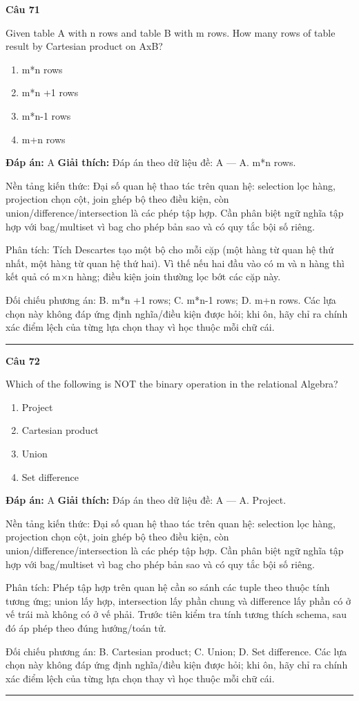 \documentclass[11pt,a4paper]{article}
\newenvironment{question}[1]{%
  \par\vspace{1em}\noindent\textbf{\large Câu #1}\par\vspace{0.4em}
}{%
  \par\vspace{1em}\hrule\vspace{0.6em}
}
\newenvironment{choices}{%
  \begin{enumerate}[label=\textbf{\Alph*.},leftmargin=2.2em,itemsep=2pt,topsep=3pt]
}{%
  \end{enumerate}
}
\newcommand{\choice}{\item}
\begin{document}
\begin{question}{71}
Given table A with n rows and table B with m rows. How many rows of table result by Cartesian product on AxB?
\begin{choices}
\choice m*n rows
\choice m*n +1 rows
\choice m*n-1 rows
\choice m+n rows
\end{choices}
\textbf{Đáp án:} A
\textbf{Giải thích:} Đáp án theo dữ liệu đề: A — A. m*n rows.

Nền tảng kiến thức: Đại số quan hệ thao tác trên quan hệ: selection lọc hàng, projection chọn cột, join ghép bộ theo điều kiện, còn union/difference/intersection là các phép tập hợp. Cần phân biệt ngữ nghĩa tập hợp với bag/multiset vì bag cho phép bản sao và có quy tắc bội số riêng.

Phân tích: Tích Descartes tạo một bộ cho mỗi cặp (một hàng từ quan hệ thứ nhất, một hàng từ quan hệ thứ hai). Vì thế nếu hai đầu vào có m và n hàng thì kết quả có m×n hàng; điều kiện join thường lọc bớt các cặp này.

Đối chiếu phương án: B. m*n +1 rows; C. m*n-1 rows; D. m+n rows. Các lựa chọn này không đáp ứng định nghĩa/điều kiện được hỏi; khi ôn, hãy chỉ ra chính xác điểm lệch của từng lựa chọn thay vì học thuộc mỗi chữ cái.
\end{question}

\begin{question}{72}
Which of the following is NOT the binary operation in the relational Algebra?
\begin{choices}
\choice Project
\choice Cartesian product
\choice Union
\choice Set difference
\end{choices}
\textbf{Đáp án:} A
\textbf{Giải thích:} Đáp án theo dữ liệu đề: A — A. Project.

Nền tảng kiến thức: Đại số quan hệ thao tác trên quan hệ: selection lọc hàng, projection chọn cột, join ghép bộ theo điều kiện, còn union/difference/intersection là các phép tập hợp. Cần phân biệt ngữ nghĩa tập hợp với bag/multiset vì bag cho phép bản sao và có quy tắc bội số riêng.

Phân tích: Phép tập hợp trên quan hệ cần so sánh các tuple theo thuộc tính tương ứng; union lấy hợp, intersection lấy phần chung và difference lấy phần có ở vế trái mà không có ở vế phải. Trước tiên kiểm tra tính tương thích schema, sau đó áp phép theo đúng hướng/toán tử.

Đối chiếu phương án: B. Cartesian product; C. Union; D. Set difference. Các lựa chọn này không đáp ứng định nghĩa/điều kiện được hỏi; khi ôn, hãy chỉ ra chính xác điểm lệch của từng lựa chọn thay vì học thuộc mỗi chữ cái.
\end{question}
\end{document}
